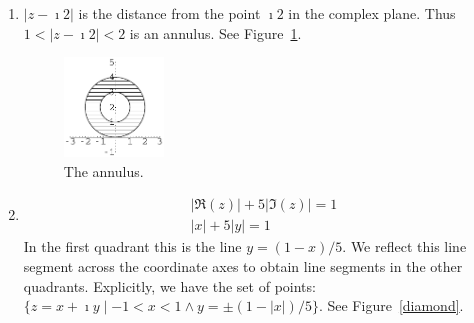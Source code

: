 {%
\begin{Solution}
  \label{solution 1 z-i2 2}
  \begin{enumerate}
  \item
    $|z - \imath 2|$ is the distance from the point $\imath 2$ in the complex plane.
    Thus $1 < |z - \imath 2| < 2$ is an annulus.  See Figure~\ref{annulus_1_2i}.

    \begin{figure}[h!]
      \begin{center}
        \includegraphics[width=0.25\textwidth]{fcv/number/annulus_1_2i}
      \end{center}
      \caption{The annulus.}
      \label{annulus_1_2i}
    \end{figure}
  \item
    \begin{gather*}
      | \Re(z) | + 5 | \Im(z) | = 1 \\
      | x | + 5 | y | = 1 
    \end{gather*}
    In the first quadrant this is the line $y = (1 - x) / 5$.  We reflect this
    line segment across the coordinate axes to obtain line segments in the 
    other quadrants.  Explicitly, we have the set of points: 
    $\{z = x + \imath y \mid -1 < x < 1 \land y = \pm (1 - |x|) / 5 \}$.
    See Figure~\ref{diamond}.


\end{enumerate}
\end{Solution}}
